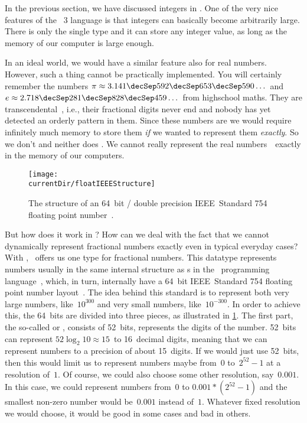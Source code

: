%
\label{sec:float}%
%
In the previous section, we have discussed integers in \python.
One of the very nice features of the \python~3 language is that integers can basically become arbitrarily large.
There is only the single type  and it can store any integer value, as long as the memory of our computer is large enough.%
%
\begin{sloppypar}%
In an ideal world, we would have a similar feature also for real numbers.
However, such a thing cannot be practically implemented.
You will certainly remember the numbers $\pi\approx3.141\decSep592\decSep653\decSep590\dots$ and $e\approx2.718\decSep281\decSep828\decSep459\dots$ from highschool maths.
They are transcendental~\cite{N1939TTOP,APM1991TOEAP,F2011TTOEAP}, i.e., their fractional digits never end and nobody has yet detected an orderly pattern in them.
Since these numbers are  we would require infinitely much memory to store them \emph{if} we wanted to represent them \emph{exactly}.
So we don't and neither does \python.
We cannot really represent the real numbers~\realNumbers\ exactly in the memory of our computers.%
\end{sloppypar}%
%
%
\label{sec:howFloatingPointNumbersWork}%
%
\begin{figure}%
\centering%
\texttt{[image: \\currentDir/floatIEEEStructure]}%
\caption{The structure of an 64~bit / double precision IEEE~Standard 754 floating point number~\cite{IEEE2019ISFFPA,H1997IS7FPN}.}%
\label{fig:floatIEEEStructure}%
\end{figure}%
%
But how does it work in \python?
How can we deal with the fact that we cannot dynamically represent fractional numbers exactly even in typical everyday cases?
With , \python\ offers us one type for fractional numbers.
This datatype represents numbers usually in the same internal structure as s in the ~programming language~\cite{PSF2024NTIFC}, which, in turn, internally have a 64~bit IEEE~Standard 754 floating point number layout~\cite{IEEE2019ISFFPA,H1997IS7FPN}.
The idea behind this standard is to represent both very large numbers, like~$10^{300}$ and very small numbers, like~$10^{-300}$.
In order to achieve this, the 64~bits are divided into three pieces, as illustrated in \cref{fig:floatIEEEStructure}.
%
%
%
The first part, the so-called  or , consists of 52~bits, represents the digits of the number.
52~bits can represent $52\log_2 10\approx 15$~to 16~decimal digits, meaning that we can represent numbers to a precision of about 15~digits.
If we would just use 52~bits, then this would limit us to represent numbers maybe from~$0$ to~$2^{52}-1$ at a resolution of~$1$.
Of course, we could also choose some other resolution, say~$0.001$.
In this case, we could represent numbers from~$0$ to $0.001*(2^{52}-1)$ and the smallest non-zero number would be~$0.001$ instead of~$1$.
Whatever fixed resolution we would choose, it would be good in some cases and bad in others.

